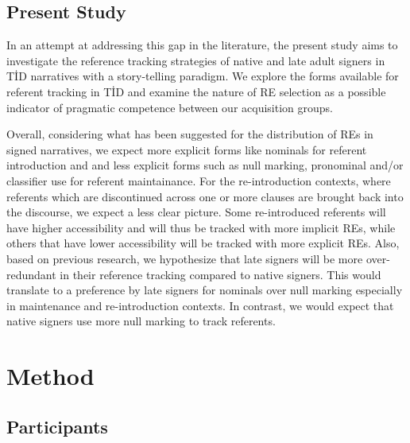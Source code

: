 \documentclass[]{elsarticle} %
\begin{document}
\hypertarget{present-study}{%
\subsection{Present Study}\label{present-study}}

In an attempt at addressing this gap in the literature, the present
study aims to investigate the reference tracking strategies of native
and late adult signers in TİD narratives with a story-telling paradigm.
We explore the forms available for referent tracking in TİD and examine
the nature of RE selection as a possible indicator of pragmatic
competence between our acquisition groups.

Overall, considering what has been suggested for the distribution of REs
in signed narratives, we expect more explicit forms like nominals for
referent introduction and and less explicit forms such as null marking,
pronominal and/or classifier use for referent maintainance. For the
re-introduction contexts, where referents which are discontinued across
one or more clauses are brought back into the discourse, we expect a
less clear picture. Some re-introduced referents will have higher
accessibility and will thus be tracked with more implicit REs, while
others that have lower accessibility will be tracked with more explicit
REs. Also, based on previous research, we hypothesize that late signers
will be more over-redundant in their reference tracking compared to
native signers. This would translate to a preference by late signers for
nominals over null marking especially in maintenance and re-introduction
contexts. In contrast, we would expect that native signers use more null
marking to track referents.

\hypertarget{method}{%
\section{Method}\label{method}}

\hypertarget{participants}{%
\subsection{Participants}\label{participants}}
\end{document}
